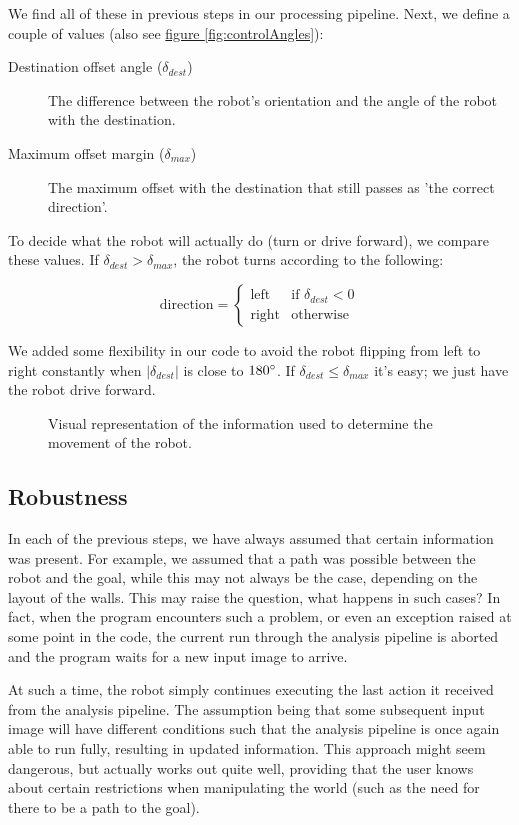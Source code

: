 \documentclass[10pt, abstracton]{scrartcl}
\newcommand{\fref}[1]{\hyperref[#1]{figure \vref{#1}}}
\begin{document}
We find all of these in previous steps in our processing pipeline. Next, we define a couple of values (also see \fref{fig:controlAngles}):

\begin{description}
\item[Destination offset angle ($\delta_{dest}$)] The difference between the robot's orientation and the angle of the robot with the destination.
\item[Maximum offset margin ($\delta_{max}$)] The maximum offset with the destination that still passes as 'the correct direction'.
\end{description}

To decide what the robot will actually do (turn or drive forward), we compare these values. If $\delta_{dest} > \delta_{max}$, the robot turns according to the following:

\[
\textrm{direction} =
\begin{cases}
\textrm{left} & \textrm{if } \delta_{dest} < 0 \\
\textrm{right} & \textrm{otherwise}
\end{cases}
\]

We added some flexibility in our code to avoid the robot flipping from left to right constantly when $\lvert \delta_{dest}\rvert$ is close to $180\degree$.
If $\delta_{dest} \leq \delta_{max}$ it's easy; we just have the robot drive forward.

\begin{figure}
	\centering
	
	\caption{\small Visual representation of the information used to determine the movement of the robot.}
	\label{fig:controlAngles}
\end{figure}

\subsection{Robustness}
In each of the previous steps, we have always assumed that certain information was present. For example, we assumed that a path was possible between the robot and the goal, while this may not always be the case, depending on the layout of the walls. This may raise the question, what happens in such cases? In fact, when the program encounters such a problem, or even an exception raised at some point in the code, the current run through the analysis pipeline is aborted and the program waits for a new input image to arrive.

At such a time, the robot simply continues executing the last action it received from the analysis pipeline. The assumption being that some subsequent input image will have different conditions such that the analysis pipeline is once again able to run fully, resulting in updated information. This approach might seem dangerous, but actually works out quite well, providing that the user knows about certain restrictions when manipulating the world (such as the need for there to be a path to the goal).
\end{document}
